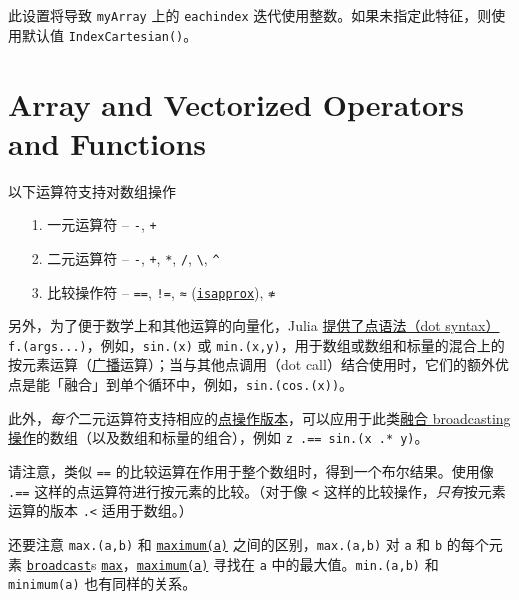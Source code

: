 此设置将导致 \texttt{myArray} 上的 \texttt{eachindex} 迭代使用整数。如果未指定此特征，则使用默认值 \texttt{IndexCartesian()}。



\hypertarget{1179855062476093403}{}


\section{Array and Vectorized Operators and Functions}



以下运算符支持对数组操作



\begin{itemize}
\item[1. ] 一元运算符 – \texttt{-}, \texttt{+}


\item[2. ] 二元运算符 – \texttt{-}, \texttt{+}, \texttt{*}, \texttt{/}, \texttt{{\textbackslash}}, \texttt{{\textasciicircum}}


\item[3. ] 比较操作符 – \texttt{==}, \texttt{!=}, \texttt{≈} (\hyperlink{12499503887608197213}{\texttt{isapprox}}), \texttt{≉}

\end{itemize}


另外，为了便于数学上和其他运算的向量化，Julia \hyperlink{17801130558550430478}{提供了点语法（dot syntax）} \texttt{f.(args...)}，例如，\texttt{sin.(x)} 或 \texttt{min.(x,y)}，用于数组或数组和标量的混合上的按元素运算（\hyperlink{10888979137852348176}{广播}运算）；当与其他点调用（dot call）结合使用时，它们的额外优点是能「融合」到单个循环中，例如，\texttt{sin.(cos.(x))}。



此外，\emph{每个}二元运算符支持相应的\hyperlink{15967322336376951940}{点操作版本}，可以应用于此类\hyperlink{17801130558550430478}{融合 broadcasting 操作}的数组（以及数组和标量的组合），例如 \texttt{z .== sin.(x .* y)}。



请注意，类似 \texttt{==} 的比较运算在作用于整个数组时，得到一个布尔结果。使用像 \texttt{.==} 这样的点运算符进行按元素的比较。（对于像 \texttt{<} 这样的比较操作，\emph{只有}按元素运算的版本 \texttt{.<} 适用于数组。）



还要注意 \texttt{max.(a,b)} 和 \hyperlink{14719513931696680717}{\texttt{maximum(a)}} 之间的区别，\texttt{max.(a,b)} 对 \texttt{a} 和 \texttt{b} 的每个元素 \hyperlink{616124539803111168}{\texttt{broadcast}}s \hyperlink{7839419811914289844}{\texttt{max}}，\hyperlink{14719513931696680717}{\texttt{maximum(a)}} 寻找在 \texttt{a} 中的最大值。\texttt{min.(a,b)} 和 \texttt{minimum(a)} 也有同样的关系。



